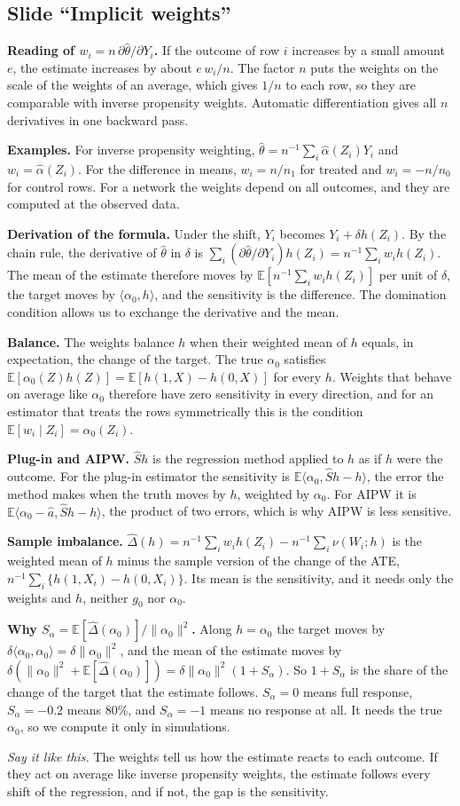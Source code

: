 \documentclass[10pt]{article}
\newcommand{\E}{\mathbb{E}}
\newcommand{\slide}[1]{\subsection*{Slide ``#1''}}
\newcommand{\say}[1]{\par\textit{Say it like this.} #1\par}
\begin{document}
\slide{Implicit weights}
\textbf{Reading of $w_i=n\,\partial\hat\theta/\partial Y_i$.} If the outcome of row $i$ increases by a small amount $e$,
the estimate increases by about $e\,w_i/n$. The factor $n$ puts the weights on the scale of the weights of an average,
which gives $1/n$ to each row, so they are comparable with inverse propensity weights. Automatic differentiation gives
all $n$ derivatives in one backward pass.

\textbf{Examples.} For inverse propensity weighting, $\hat\theta=n^{-1}\sum_i\hat\alpha(Z_i)Y_i$ and $w_i=\hat\alpha(Z_i)$.
For the difference in means, $w_i=n/n_1$ for treated and $w_i=-n/n_0$ for control rows. For a network the weights
depend on all outcomes, and they are computed at the observed data.

\textbf{Derivation of the formula.} Under the shift, $Y_i$ becomes $Y_i+\delta h(Z_i)$. By the chain rule, the
derivative of $\hat\theta$ in $\delta$ is $\sum_i(\partial\hat\theta/\partial Y_i)h(Z_i)=n^{-1}\sum_iw_ih(Z_i)$. The
mean of the estimate therefore moves by $\E[n^{-1}\sum_iw_ih(Z_i)]$ per unit of $\delta$, the target moves by
$\langle\alpha_0,h\rangle$, and the sensitivity is the difference. The domination condition allows us to exchange the
derivative and the mean.

\textbf{Balance.} The weights balance $h$ when their weighted mean of $h$ equals, in expectation, the change of the
target. The true $\alpha_0$ satisfies $\E[\alpha_0(Z)h(Z)]=\E[h(1,X)-h(0,X)]$ for every $h$. Weights that behave on
average like $\alpha_0$ therefore have zero sensitivity in every direction, and for an estimator that treats the rows
symmetrically this is the condition $\E[w_i\mid Z_i]=\alpha_0(Z_i)$.

\textbf{Plug-in and AIPW.} $\hat Sh$ is the regression method applied to $h$ as if $h$ were the outcome. For the plug-in
estimator the sensitivity is $\E\langle\alpha_0,\hat Sh-h\rangle$, the error the method makes when the truth moves by
$h$, weighted by $\alpha_0$. For AIPW it is $\E\langle\alpha_0-\hat a,\hat Sh-h\rangle$, the product of two errors,
which is why AIPW is less sensitive.

\textbf{Sample imbalance.} $\hat\Delta(h)=n^{-1}\sum_iw_ih(Z_i)-n^{-1}\sum_i\nu(W_i;h)$ is the weighted mean of $h$ minus
the sample version of the change of the ATE, $n^{-1}\sum_i\{h(1,X_i)-h(0,X_i)\}$. Its mean is the sensitivity, and it
needs only the weights and $h$, neither $g_0$ nor $\alpha_0$.

\textbf{Why $S_\alpha=\E[\hat\Delta(\alpha_0)]/\|\alpha_0\|^2$.} Along $h=\alpha_0$ the target moves by
$\delta\langle\alpha_0,\alpha_0\rangle=\delta\|\alpha_0\|^2$, and the mean of the estimate moves by
$\delta(\|\alpha_0\|^2+\E[\hat\Delta(\alpha_0)])=\delta\|\alpha_0\|^2(1+S_\alpha)$. So $1+S_\alpha$ is the share of the
change of the target that the estimate follows. $S_\alpha=0$ means full response, $S_\alpha=-0.2$ means 80\%, and
$S_\alpha=-1$ means no response at all. It needs the true $\alpha_0$, so we compute it only in simulations.
\say{The weights tell us how the estimate reacts to each outcome. If they act on average like inverse propensity
weights, the estimate follows every shift of the regression, and if not, the gap is the sensitivity.}
\end{document}
